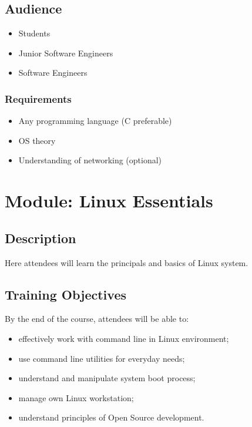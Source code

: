 \documentclass[12pt,a4paper,oneside]{article}
\begin{document}
\subsection{Audience}
\begin{itemize}
	\item Students
	\item Junior Software Engineers
	\item Software Engineers
\end{itemize}

\subsubsection{Requirements}
\begin{itemize}
	\item Any programming language (C preferable)
	\item OS theory
	\item Understanding of networking (optional)
\end{itemize}

\newpage

\section{Module: Linux Essentials}

\subsection{Description}

Here attendees will learn the principals and basics of Linux system.

\subsection{Training Objectives}

By the end of the course,  attendees will be able to:
\begin{itemize}
	\item effectively work with command line in Linux environment;
	\item use command line utilities for everyday needs;
	\item understand and manipulate system boot process;
	\item manage own Linux workstation;
	\item understand principles of Open Source development.
\end{itemize}
\end{document}
